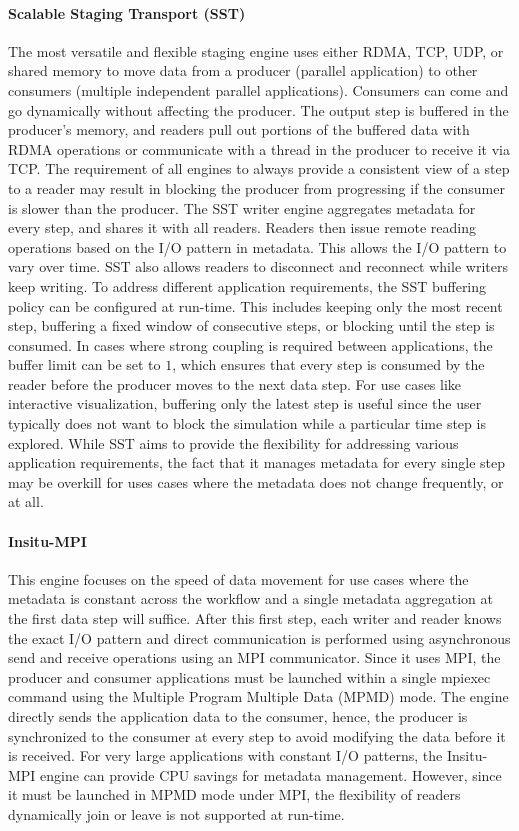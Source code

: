 \paragraph{\textbf{Scalable Staging Transport (SST)}}
The most versatile and flexible staging engine uses either RDMA, TCP, UDP, or shared memory to move data from a producer (parallel application) to other consumers (multiple independent parallel applications). Consumers can come and go dynamically without affecting the producer. The output step is buffered in the producer's memory, and readers pull out portions of the buffered data with RDMA operations or communicate with a thread in the producer to receive it via TCP. The requirement of all engines to always provide a consistent view of a step to a reader may result in blocking the producer from progressing if the consumer is slower than the producer. The SST writer engine aggregates metadata for every step, and shares it with all readers. Readers then issue remote reading operations based on the I/O pattern in metadata. This allows the I/O pattern to vary over time. SST also allows readers to disconnect and reconnect while writers keep writing.
To address different application requirements, the SST buffering policy can be configured at run-time. This includes keeping only the most recent step, buffering a fixed window of consecutive steps, or blocking until the step is consumed. In cases where strong coupling is required between applications, the buffer limit can be set to $1$, which ensures that every step is consumed by the reader before the producer moves to the next data step.
For use cases like interactive visualization, buffering only the latest step is useful since the user typically does not want to block the simulation while a particular time step is explored.
While SST aims to provide the flexibility for addressing various application requirements, the fact that it manages metadata for every single step may be overkill for uses cases where the metadata does not change frequently, or at all.
 
\paragraph{\textbf{Insitu-MPI}}
This engine focuses on the speed of data movement for use cases where the metadata is constant across the workflow and a single metadata aggregation at the first data step will suffice. After this first step, each writer and reader knows the exact I/O pattern and direct communication is performed using asynchronous send and receive operations using an MPI  communicator. Since it uses MPI, the producer and consumer applications must be launched within a single mpiexec command using the Multiple Program Multiple Data (MPMD) mode. The engine directly sends the application data to the consumer, hence, the producer is synchronized to the consumer at every step to avoid modifying the data before it is received. 
For very large applications with constant I/O patterns, the Insitu-MPI engine can provide CPU savings for metadata management. However, since it must be launched in MPMD mode under MPI, the flexibility of readers dynamically join or leave is not supported at run-time.


